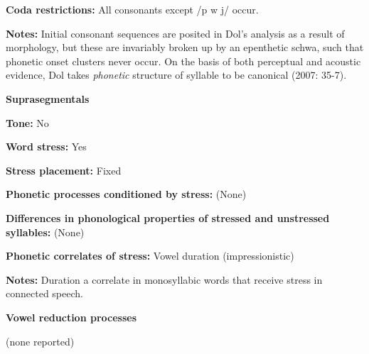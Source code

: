 \begin{styleBody}
\textbf{Coda restrictions:} All consonants except /p w j/ occur.
\end{styleBody}

\begin{styleBody}
\textbf{Notes:} Initial consonant sequences are posited in Dol’s analysis as a result of morphology, but these are invariably broken up by an epenthetic schwa, such that phonetic onset clusters never occur. On the basis of both perceptual and acoustic evidence, Dol takes \textit{phonetic} structure of syllable to be canonical (2007: 35-7).
\end{styleBody}

\begin{styleBody}
\textbf{Suprasegmentals}
\end{styleBody}

\begin{styleBody}
\textbf{Tone: }No
\end{styleBody}

\begin{styleBody}
\textbf{Word stress: }Yes
\end{styleBody}

\begin{styleBody}
\textbf{Stress placement:} Fixed
\end{styleBody}

\begin{styleBody}
\textbf{Phonetic processes conditioned by stress:} (None)
\end{styleBody}

\begin{styleBody}
\textbf{Differences in phonological properties of stressed and unstressed syllables:} (None)
\end{styleBody}

\begin{styleBody}
\textbf{Phonetic correlates of stress: }Vowel duration (impressionistic)
\end{styleBody}

\begin{styleBody}
\textbf{Notes: }Duration a correlate in monosyllabic words that receive stress in connected speech.
\end{styleBody}

\begin{styleBody}
\textbf{Vowel reduction processes}
\end{styleBody}

\begin{styleBody}
(none reported)
\end{styleBody}

